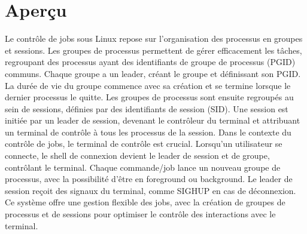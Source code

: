 \section{Aperçu}
Le contrôle de jobs sous Linux repose sur l'organisation des processus en groupes et sessions. Les groupes de processus permettent de gérer efficacement les tâches, regroupant des processus ayant des identifiants de groupe de processus (PGID) communs. Chaque groupe a un leader, créant le groupe et définissant son PGID. La durée de vie du groupe commence avec sa création et se termine lorsque le dernier processus le quitte.
\newline
Les groupes de processus sont ensuite regroupés au sein de sessions, définies par des identifiants de session (SID). Une session est initiée par un leader de session, devenant le contrôleur du terminal et attribuant un terminal de contrôle à tous les processus de la session.
\newline
Dans le contexte du contrôle de jobs, le terminal de contrôle est crucial. Lorsqu'un utilisateur se connecte, le shell de connexion devient le leader de session et de groupe, contrôlant le terminal. Chaque commande/job lance un nouveau groupe de processus, avec la possibilité d'être en foreground ou background. Le leader de session reçoit des signaux du terminal, comme SIGHUP en cas de déconnexion.
\newline
Ce système offre une gestion flexible des jobs, avec la création de groupes de processus et de sessions pour optimiser le contrôle des interactions avec le terminal.
